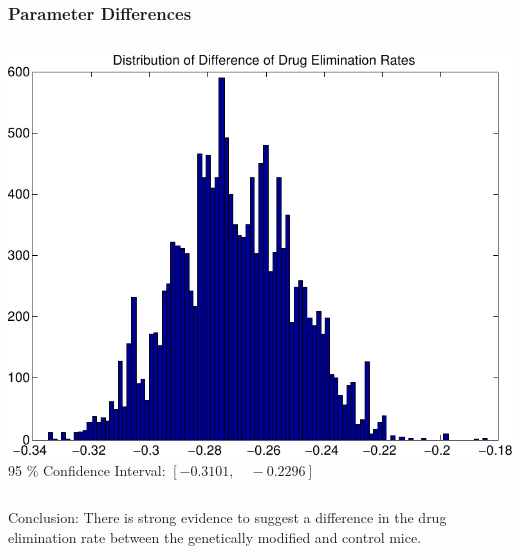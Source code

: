 \documentclass[t]{beamer}
\begin{document}
\begin{frame}
  \frametitle{Parameter Differences}
  \begin{columns}[T]
  \includegraphics[width=\textwidth]{elim_rate_diff.pdf}
    \vspace{2cm}
    95 \% Confidence Interval: $[-0.3101,\quad -0.2296]$
  \end{columns}
  \pause
  Conclusion:  There is strong evidence to suggest a difference in the \alert{drug elimination rate} between the genetically modified and control mice.
\end{frame}
\end{document}
